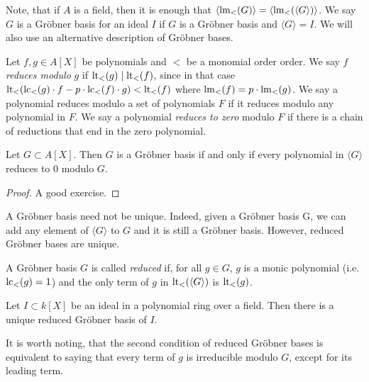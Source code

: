 Note, that if $A$ is a field, then it is enough that $\langle \operatorname{lm}_{<}(G) \rangle = \langle \operatorname{lm}_{<}(\langle G \rangle) \rangle$. We say $G$ is a Gröbner basis for an ideal $I$ if $G$ is a Gröbner basis and $\langle G \rangle = I$. We will also use an alternative description of Gröbner bases.

\begin{definition}
  Let $f, g \in A[X]$ be polynomials and $<$ be a monomial order order. We say $f$ \textit{reduces modulo} $g$ if $\operatorname{lt}_{<}(g) \mid \operatorname{lt}_{<}(f)$, since in that case $\operatorname{lt}_{<}(\operatorname{lc}_{<}(g)\cdot f - p\cdot \operatorname{lc}_{<}(f) \cdot g) < \operatorname{lt}_{<}(f)$ where $\operatorname{lm}_{<}(f) = p \cdot \operatorname{lm}_{<}(g)$. We say a polynomial reduces modulo a set of polynomials $F$ if it reduces modulo any polynomial in $F$. We say a polynomial \textit{reduces to zero} modulo $F$ if there is a chain of reductions that end in the zero polynomial.
\end{definition}

\begin{theorem}\label{thm:grb}
  Let $G \subset A[X]$. Then $G$ is a Gröbner basis if and only if every polynomial in $\langle G \rangle$ reduces to 0 modulo $G$.
\end{theorem}
\begin{proof}
  A good exercise.
\end{proof}

A Gröbner basis need not be unique. Indeed, given a Gröbner basis G, we can add any element of $\langle G \rangle$ to $G$ and it is still a Gröbner basis. However, reduced Gröbner bases are unique.

\begin{definition}
  A Gröbner basis $G$ is called \textit{reduced} if, for all $g \in G$, $g$ is a monic polynomial (i.e. $\operatorname{lc}_{<}(g) = 1$) and the only term of $g$ in $\operatorname{lt}_{<}(\langle G \rangle)$ is $\operatorname{lt}_{<}(g)$.
\end{definition}
\begin{theorem}
  Let $I \subset k[X]$ be an ideal in a polynomial ring over a field. Then there is a unique reduced Gröbner basis of $I$.
\end{theorem}

It is worth noting, that the second condition of reduced Gröbner bases is equivalent to saying that every term of $g$ is irreducible modulo $G$, except for its leading term.
